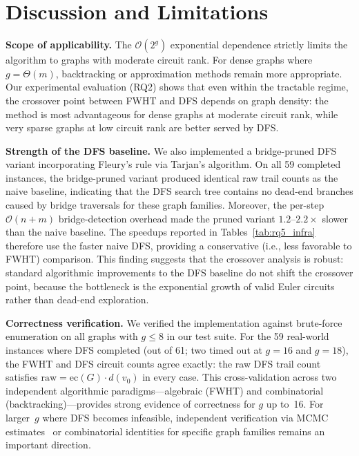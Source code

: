 \documentclass[acmsmall,review]{acmart}
\newcommand{\ec}{\text{ec}}
\newcommand{\bigO}{\mathcal{O}}
\begin{document}
	\section{Discussion and Limitations}
	\label{sec:discussion}
	
	\textbf{Scope of applicability.} The $\bigO(2^g)$ exponential dependence strictly limits the algorithm to graphs with moderate circuit rank. For dense graphs where $g = \Theta(m)$, backtracking or approximation methods remain more appropriate. Our experimental evaluation (RQ2) shows that even within the tractable regime, the crossover point between FWHT and DFS depends on graph density: the method is most advantageous for dense graphs at moderate circuit rank, while very sparse graphs at low circuit rank are better served by DFS.
	
	\textbf{Strength of the DFS baseline.} We also implemented a bridge-pruned DFS variant incorporating Fleury's rule via Tarjan's algorithm. On all 59 completed instances, the bridge-pruned variant produced identical raw trail counts as the naive baseline, indicating that the DFS search tree contains no dead-end branches caused by bridge traversals for these graph families. Moreover, the per-step $\bigO(n{+}m)$ bridge-detection overhead made the pruned variant $1.2$--$2.2\times$ slower than the naive baseline. The speedups reported in Tables~\ref{tab:rq5_infra} therefore use the faster naive DFS, providing a conservative (i.e., less favorable to FWHT) comparison. This finding suggests that the crossover analysis is robust: standard algorithmic improvements to the DFS baseline do not shift the crossover point, because the bottleneck is the exponential growth of valid Euler circuits rather than dead-end exploration.
	
	\textbf{Correctness verification.} We verified the implementation against brute-force enumeration on all graphs with $g \le 8$ in our test suite. For the 59 real-world instances where DFS completed (out of 61; two timed out at $g = 16$ and $g = 18$), the FWHT and DFS circuit counts agree exactly: the raw DFS trail count satisfies $\text{raw} = \ec(G) \cdot d(v_0)$ in every case. This cross-validation across two independent algorithmic paradigms---algebraic (FWHT) and combinatorial (backtracking)---provides strong evidence of correctness for $g$ up to~16. For larger~$g$ where DFS becomes infeasible, independent verification via MCMC estimates~\cite{CreedGoldberg2013} or combinatorial identities for specific graph families remains an important direction.
	
\end{document}
